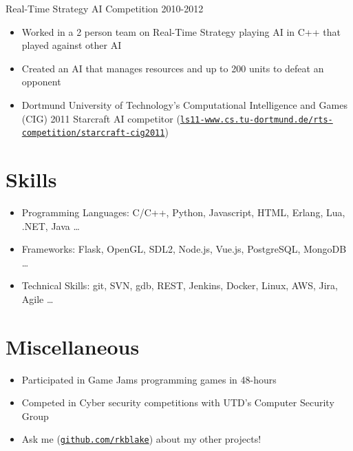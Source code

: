 \documentclass[line,margin]{res}
\begin{document}
\begin{resume}
\vspace{-8pt}
Real-Time Strategy AI Competition
\hfill 2010-2012
\begin{itemize} \itemsep -2pt
	\item Worked in a 2 person team on Real-Time Strategy playing AI in C++ that played against other AI
	\item Created an AI that manages resources and up to 200 units to defeat an opponent
	\item Dortmund University of Technology’s Computational Intelligence and Games (CIG) 2011 Starcraft AI
	competitor (\href{http://ls11-www.cs.tu-dortmund.de/rts-competition/starcraft-cig2011}{\texttt{ls11-www.cs.tu-dortmund.de/rts-competition/starcraft-cig2011}})
\end{itemize}

\vspace{-4pt}
\section{Skills}
\vspace{22pt}
	\begin{itemize} \itemsep -2pt
		\item Programming Languages: C/C++, Python, Javascript, HTML, Erlang, Lua, .NET, Java \ldots
		\item Frameworks: Flask, OpenGL, SDL2, Node.js, Vue.js, PostgreSQL, MongoDB \ldots
		\item Technical Skills: git, SVN, gdb, REST, Jenkins, Docker, Linux, AWS, Jira, Agile \ldots
	\end{itemize}

\vspace{-4pt}
\section{Miscellaneous}
\vspace{22pt}
	\begin{itemize} \itemsep -2pt
	\item Participated in Game Jams programming games in 48-hours
	\item Competed in Cyber security competitions with UTD's Computer Security Group
	\item Ask me (\href{https://github.com/rkblake}{\texttt{github.com/rkblake}}) about my other projects!
	\end{itemize}

\end{resume}
\end{document}
